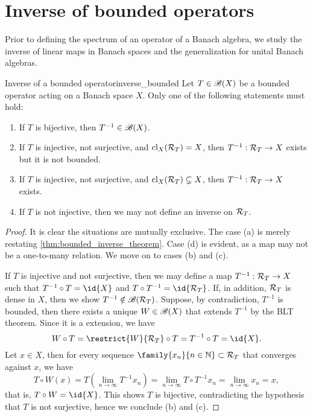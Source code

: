 \section{Inverse of bounded operators}
Prior to defining the spectrum of an operator of a Banach algebra, we study the inverse of linear maps in Banach spaces and the generalization for unital Banach algebras.
\begin{theorem}{Inverse of a bounded operator}{inverse_bounded}
    Let \(T \in \mathscr{B}(X)\) be a bounded operator acting on a Banach space \(X\). Only one of the following statements must hold:
    \begin{enumerate}[label=(\alph*)]
        \item If \(T\) is bijective, then \(T^{-1} \in \mathscr{B}(X)\).
        \item If \(T\) is injective, not surjective, and \(\operatorname{cl}_X(\mathcal{R}_{T}) = X\), then \(T^{-1} : \mathcal{R}_{T} \to X\) exists but it is not bounded.
        \item If \(T\) is injective, not surjective, and \(\operatorname{cl}_X(\mathcal{R}_{T}) \subsetneq X\), then \(T^{-1} : \mathcal{R}_{T} \to X\) exists.
        \item If \(T\) is not injective, then we may not define an inverse on \(\mathcal{R}_{T}\).
    \end{enumerate}
\end{theorem}
\begin{proof}
    It is clear the situations are mutually exclusive. The case (a) is merely restating \cref{thm:bounded_inverse_theorem}. Case (d) is evident, as a map may not be a one-to-many relation. We move on to cases (b) and (c).

    If \(T\) is injective and not surjective, then we may define a map \(T^{-1} : \mathcal{R}_{T} \to X\) such that \(T^{-1} \circ T = \id{X}\) and \(T \circ T^{-1} = \id{\range{T}}\). If, in addition, \(\mathcal{R}_{T}\) is dense in \(X\), then we show \(T^{-1} \notin \mathscr{B}(\mathcal{R}_{T})\). Suppose, by contradiction, \(T^{-1}\) is bounded, then there exists a unique \(W \in \mathscr{B}(X)\) that extends \(T^{-1}\) by the BLT theorem. Since it is a extension, we have
    \begin{equation*}
        W \circ T = \restrict{W}{\range{T}} \circ T = T^{-1} \circ T = \id{X}.
    \end{equation*}
    Let \(x \in X\), then for every sequence \(\family{x_n}{n \in \mathbb{N}}\subset \range{T}\) that converges against \(x\), we have
    \begin{equation*}
        T\circ W(x) = T\left(\lim_{n\to \infty} T^{-1}x_n\right) = \lim_{n\to \infty} T\circ T^{-1} x_n = \lim_{n\to\infty} x_n = x,
    \end{equation*}
    that is, \(T \circ W = \id{X}\). This shows \(T\) is bijective, contradicting the hypothesis that \(T\) is not surjective, hence we conclude (b) and (c).
\end{proof}
